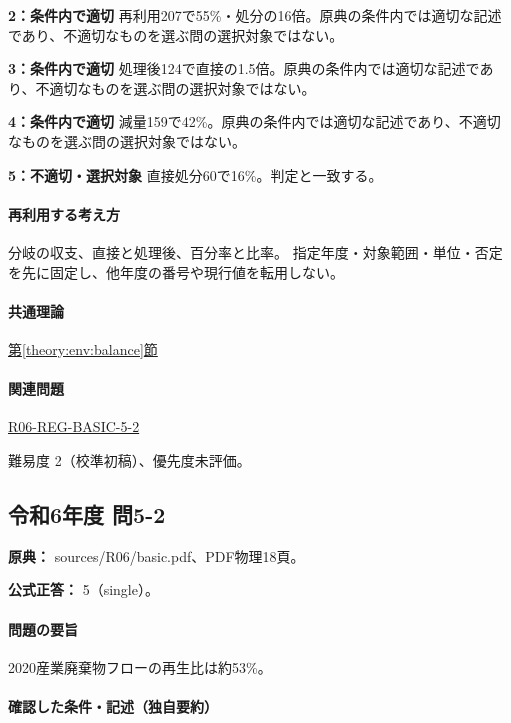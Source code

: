 \noindent\textbf{2：条件内で適切} 再利用207で55\%・処分の16倍。原典の条件内では適切な記述であり、不適切なものを選ぶ問の選択対象ではない。\par

\noindent\textbf{3：条件内で適切} 処理後124で直接の1.5倍。原典の条件内では適切な記述であり、不適切なものを選ぶ問の選択対象ではない。\par

\noindent\textbf{4：条件内で適切} 減量159で42\%。原典の条件内では適切な記述であり、不適切なものを選ぶ問の選択対象ではない。\par

\noindent\textbf{5：不適切・選択対象} 直接処分60で16\%。判定と一致する。\par

\paragraph{再利用する考え方} 分岐の収支、直接と処理後、百分率と比率。 指定年度・対象範囲・単位・否定を先に固定し、他年度の番号や現行値を転用しない。

\paragraph{共通理論} \hyperref[theory:env:balance]{第\ref*{theory:env:balance}節}

\paragraph{関連問題} \hyperref[q:r06-reg-basic-5-2]{R06-REG-BASIC-5-2}

\par 難易度 2（校準初稿）、優先度未評価。

\subsection{令和6年度 問5-2}
\label{q:r06-reg-basic-5-2}

\noindent\textbf{原典：} sources/R06/basic.pdf、PDF物理18頁。

\textbf{公式正答：} 5（single）。

\paragraph{問題の要旨} 2020産業廃棄物フローの再生比は約53\%。

\paragraph{確認した条件・記述（独自要約）}\mbox{}\par


